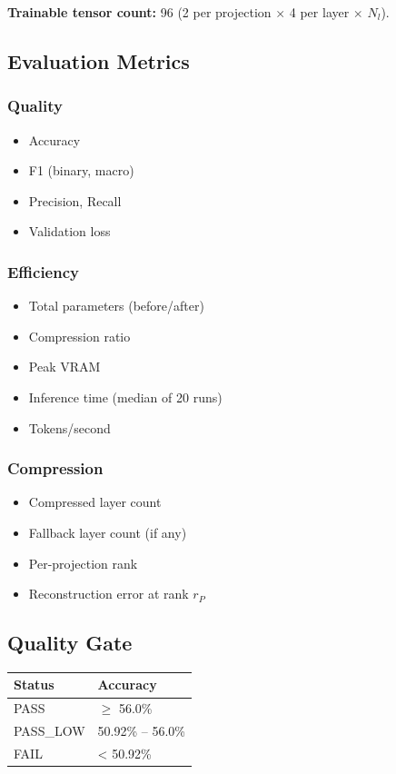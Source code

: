 \textbf{Trainable tensor count:} 96 (2 per projection $\times$ 4 per 
layer $\times$ $N_l$).

\subsection{Evaluation Metrics}

\subsubsection{Quality}
\begin{itemize}
\item Accuracy
\item F1 (binary, macro)
\item Precision, Recall
\item Validation loss

\end{itemize}
\subsubsection{Efficiency}
\begin{itemize}
\item Total parameters (before/after)
\item Compression ratio
\item Peak VRAM
\item Inference time (median of 20 runs)
\item Tokens/second

\end{itemize}
\subsubsection{Compression}
\begin{itemize}
\item Compressed layer count
\item Fallback layer count (if any)
\item Per-projection rank
\item Reconstruction error at rank $r_P$

\end{itemize}
\subsection{Quality Gate}

\begin{table}[H]
\centering
\small
\begin{tabular}{ll}
\toprule
\textbf{Status} & \textbf{Accuracy} \\
\midrule
PASS & $\ge$ 56.0\% \\
PASS\_LOW & 50.92\% -- 56.0\% \\
FAIL & < 50.92\% \\
\bottomrule
\end{tabular}
\end{table}

